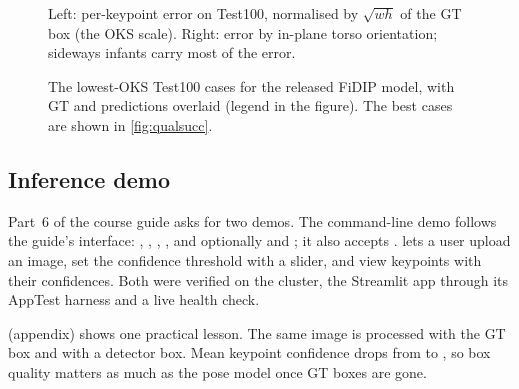 \begin{figure}[t]
  \centering
  \begin{minipage}[b]{0.5\linewidth}\centering
  \end{minipage}\hfill
  \begin{minipage}[b]{0.46\linewidth}\centering
  \end{minipage}
  \caption{Left: per-keypoint error on Test100, normalised by $\sqrt{wh}$ of the GT box (the OKS scale). Right: error by in-plane torso orientation; sideways infants carry most of the error.}
  \label{fig:perkp}
\end{figure}


\begin{figure}[t]
  \centering
  \caption{The lowest-OKS Test100 cases for the released FiDIP model, with GT and predictions overlaid (legend in the figure). The best cases are shown in \cref{fig:qualsucc}.}
  \label{fig:qual}
\end{figure}

\subsection{Inference demo}\label{sec:demo}

Part~6 of the course guide asks for two demos. The command-line demo  follows the guide's interface: , , , , and optionally  and ; it also accepts .
 lets a user upload an image, set the confidence threshold with a slider, and view keypoints with their confidences. Both were verified on the cluster, the Streamlit app through its AppTest harness and a live health check.

 (appendix) shows one practical lesson. The same image is processed with the GT box and with a detector box. Mean keypoint confidence drops from  to , so box quality matters as much as the pose model once GT boxes are gone.

